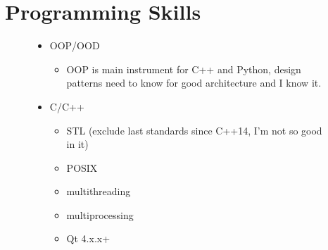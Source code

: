 \documentclass[letterpaper,11pt]{article}
\begin{document}
\section{Programming Skills}
  \begin{figure}[h!]
    \begin{minipage}[h!]{0.49\textwidth}
      \begin{itemize}
        \item {OOP/OOD}
          \begin{itemize}
            \item OOP is main instrument for C++ and Python, design patterns need to know for good architecture and I know it.
          \end{itemize}
        \item{C/C++}
          \begin{itemize}
	    \item STL (exclude last standards since C++14, I'm not so good in it)
	    \item POSIX
	    \item multithreading
	    \item multiprocessing
	    \item Qt 4.x.x+
          \end{itemize}
      \end{itemize}
    \end{minipage}
    \hfill
    \begin{minipage}[h!]{0.49\textwidth}

\end{minipage}
\end{figure}
\end{document}
